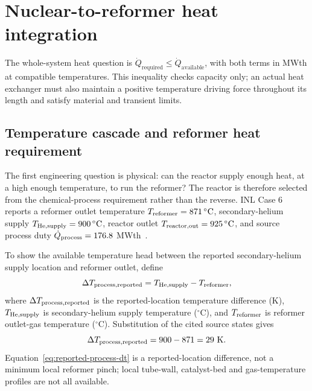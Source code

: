 \section{Nuclear-to-reformer heat integration}\label{sec:heat-integration}


The whole-system heat question is $\dot Q_{\mathrm{required}}\leq\dot Q_{\mathrm{available}}$, with both terms in MWth at compatible temperatures. This inequality checks capacity only; an actual heat exchanger must also maintain a positive temperature driving force throughout its length and satisfy material and transient limits.

\subsection{Temperature cascade and reformer heat requirement}
The first engineering question is physical: can the reactor supply enough heat, at a high enough temperature, to run the reformer? The reactor is therefore selected from the chemical-process requirement rather than the reverse. INL Case 6 reports a reformer outlet temperature $T_{\rm reformer}=871\,^{\circ}\mathrm C$, secondary-helium supply $T_{\rm He,supply}=900\,^{\circ}\mathrm C$, reactor outlet $T_{\rm reactor,out}=925\,^{\circ}\mathrm C$, and source process duty $\dot Q_{\rm process}=176.8$ MWth~\cite{inltev953,inltev961}.

To show the available temperature head between the reported secondary-helium supply location and reformer outlet, define
\begin{equation}\label{eq:reported-process-dt-general}
\Delta T_{\rm process,reported}
=T_{\rm He,supply}-T_{\rm reformer},
\end{equation}
where $\Delta T_{\rm process,reported}$ is the reported-location temperature difference (K), $T_{\rm He,supply}$ is secondary-helium supply temperature ($^{\circ}$C), and $T_{\rm reformer}$ is reformer outlet-gas temperature ($^{\circ}$C). Substitution of the cited source states gives
\begin{equation}\label{eq:reported-process-dt}
\Delta T_{\rm process,reported}
=900-871=29~\mathrm K.
\end{equation}
Equation~\ref{eq:reported-process-dt} is a reported-location difference, not a minimum local reformer pinch; local tube-wall, catalyst-bed and gas-temperature profiles are not all available.

